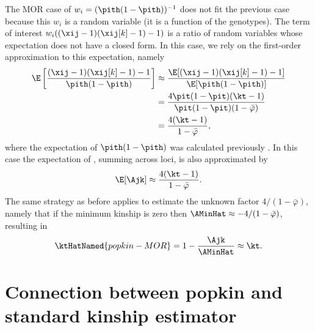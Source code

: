 \documentclass[11pt]{article}
\begin{document}
\begin{appendices}
  The MOR case of $w_i = (\pith (1-\pith))^{-1}$ does not fit the previous case because this $w_i$ is a random variable (it is a function of the genotypes).
  The term of interest $w_i ( (\xij-1)(\xij[k]-1) - 1 )$ is a ratio of random variables whose expectation does not have a closed form.
  In this case, we rely on the first-order approximation to this expectation, namely
  \begin{align*}
    \E \left[ \frac{ (\xij-1)(\xij[k]-1) - 1 }{ \pith (1-\pith) } \right]
    &\approx
      \frac{ \E[ (\xij-1)(\xij[k]-1) - 1 ] }{ \E[ \pith (1-\pith) ] }
    \\
    &=
      \frac{ 4 \pit ( 1 - \pit ) ( \kt - 1 ) }{ \pit (1-\pit) ( 1 - \bar{\varphi} ) }
    \\
    &=
      \frac{ 4 ( \kt - 1 ) }{ 1 - \bar{\varphi} }
  ,
  \end{align*}
  where the expectation of $\pith (1-\pith)$ was calculated previously \citep{ochoa_estimating_2021}.
  In this case the expectation of \Ajk, summing across loci, is also approximated by
  $$
  \E[ \Ajk ]
  \approx
  \frac{ 4 ( \kt - 1 ) }{ 1 - \bar{\varphi} }
  .
  $$
  The same strategy as before applies to estimate the unknown factor $4 / ( 1- \bar{\varphi} )$, namely that if the minimum kinship is zero then $\AMinHat \approx - 4 / ( 1- \bar{\varphi} )$, resulting in
  $$
  \ktHatNamed{popkin-MOR}
  =
  1 - \frac{\Ajk}{\AMinHat}
  \approx
  \kt
  .
  $$

  \section{Connection between popkin and standard kinship estimator}

  \label{sec:conn_popkin_std}  


\end{appendices}
\end{document}
